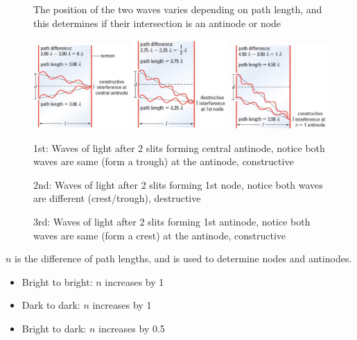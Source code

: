 \documentclass[a4paper,12pt]{article}
\begin{document}
\begin{figure}[H]
    \centering
    \caption{The position of the two waves varies depending on path length, and this determines if their intersection is an antinode or node}
    \includegraphics[width=0.325\textwidth]{slit1}
    \includegraphics[width=0.325\textwidth]{slit2}
    \includegraphics[width=0.325\textwidth]{slit3}
    \caption{1st: Waves of light after 2 slits forming central antinode, notice both waves are same (form a trough) at the antinode, constructive}
    \caption{2nd: Waves of light after 2 slits forming 1st node, notice both waves are different (crest/trough), destructive}
    \caption{3rd: Waves of light after 2 slits forming 1st antinode, notice both waves are same (form a crest) at the antinode, constructive}
\end{figure}

$n$ is the difference of path lengths, and is used to determine nodes and antinodes.
\begin{itemize}
    \item{Bright to bright: $n$ increases by \num{1}}
    \item{Dark to dark: $n$ increases by \num{1}}
    \item{Bright to dark: $n$ increases by \num{0.5}}
\end{itemize}
\end{document}

